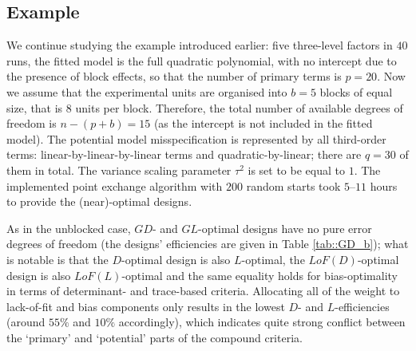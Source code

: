 \subsection{Example}

We continue studying the example introduced earlier: five three-level factors in $40$ runs, the fitted model is the full quadratic polynomial, with no intercept due to the presence of block effects, so that the number of primary terms is $p=20$. Now we assume that the experimental units are organised into $b=5$ blocks of equal size, that is $8$ units per block. Therefore, the total number of available degrees of freedom is $n-(p+b)=15$ (as the intercept is not included in the fitted model). The potential model misspecification is represented by all third-order terms: linear-by-linear-by-linear terms and quadratic-by-linear; there are $q=30$ of them in total. The variance scaling parameter $\tau^2$ is set to be equal to $1$. The implemented point exchange algorithm with $200$ random starts took $5$--$11$ hours to provide the (near)-optimal designs. 

As in the unblocked case, $GD$- and $GL$-optimal designs have no pure error degrees of freedom (the designs' efficiencies are given in Table \ref{tab::GD_b}); what is notable is that the $D$-optimal design is also $L$-optimal, the $LoF(D)$-optimal design is also $LoF(L)$-optimal and the same equality holds for bias-optimality in terms of determinant- and trace-based criteria. Allocating all of the weight to lack-of-fit and bias components only results in the lowest $D$- and $L$-efficiencies (around $55\%$ and $10\%$ accordingly), which indicates quite strong conflict between the `primary' and `potential' parts of the compound criteria.

